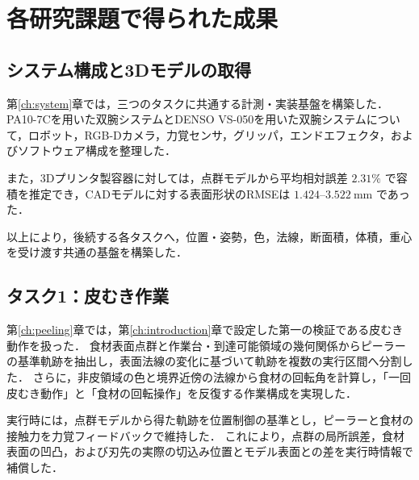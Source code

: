 \section{各研究課題で得られた成果}
\label{sec:conclusion_results}

\subsection{システム構成と3Dモデルの取得}
\label{subsec:conclusion_common_model}

第\ref{ch:system}章では，三つのタスクに共通する計測・実装基盤を構築した．PA10-7Cを用いた双腕システムとDENSO VS-050を用いた双腕システムについて，ロボット，RGB-Dカメラ，力覚センサ，グリッパ，エンドエフェクタ，およびソフトウェア構成を整理した．

また，3Dプリンタ製容器に対しては，点群モデルから平均相対誤差 $2.31\%$ で容積を推定でき，CADモデルに対する表面形状のRMSEは $1.424$--$3.522~\mathrm{mm}$ であった．

以上により，後続する各タスクへ，位置・姿勢，色，法線，断面積，体積，重心を受け渡す共通の基盤を構築した．

\subsection{タスク1：皮むき作業}
\label{subsec:conclusion_peeling}

第\ref{ch:peeling}章では，第\ref{ch:introduction}章で設定した第一の検証である皮むき動作を扱った．
食材表面点群と作業台・到達可能領域の幾何関係からピーラーの基準軌跡を抽出し，表面法線の変化に基づいて軌跡を複数の実行区間へ分割した．
さらに，非皮領域の色と境界近傍の法線から食材の回転角を計算し，「一回皮むき動作」と「食材の回転操作」を反復する作業構成を実現した．

実行時には，点群モデルから得た軌跡を位置制御の基準とし，ピーラーと食材の接触力を力覚フィードバックで維持した．
これにより，点群の局所誤差，食材表面の凹凸，および刃先の実際の切込み位置とモデル表面との差を実行時情報で補償した．

